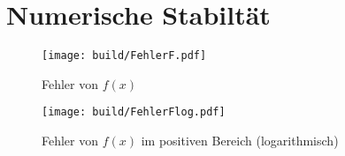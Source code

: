 



\section{Numerische Stabiltät}

\begin{figure}
  \centering
  \texttt{[image: build/FehlerF.pdf]}
  \caption{Fehler von $f(x)$}
  \label{fig:FehlerF}
\end{figure}

\begin{figure}
  \centering
  \texttt{[image: build/FehlerFlog.pdf]}
  \caption{Fehler von $f(x)$ im positiven Bereich (logarithmisch)}
  \label{fig:FehlerFlog}
\end{figure}




